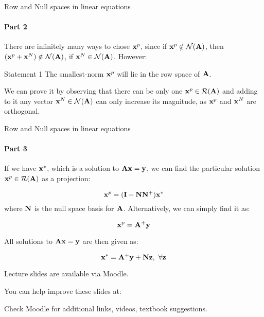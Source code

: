 \documentclass{beamer}
\begin{document}
\begin{frame}{Row and Null spaces in linear equations}
\framesubtitle{Part 2}
\begin{flushleft}

There are infinitely many ways to chose $\mathbf{x}^p$, since if $\mathbf{x}^p \notin \mathcal{N}(\mathbf{A})$, then $(\mathbf{x}^p + \mathbf{x}^N) \notin \mathcal{N}(\mathbf{A})$, if $\mathbf{x}^N \in \mathcal{N}(\mathbf{A})$. However: 

\begin{block}{Statement 1}
The smallest-norm $\mathbf{x}^p$ will lie in the row space of $\mathbf{A}$.
\end{block}

\bigskip

We can prove it by observing that there can be only one $\mathbf{x}^p \in \mathcal{R}(\mathbf{A})$ and adding to it any vector $\mathbf{x}^N \in \mathcal{N}(\mathbf{A})$ can only increase its magnitude, as $\mathbf{x}^p$ and $\mathbf{x}^N$ are orthogonal.

\end{flushleft}
\end{frame}



\begin{frame}{Row and Null spaces in linear equations}
\framesubtitle{Part 3}
\begin{flushleft}

If we have $\mathbf{x}^*$, which is a solution to $\mathbf{A} \mathbf{x} = \mathbf{y}$, we can find the particular solution $\mathbf{x}^p \in \mathcal{R}(\mathbf{A})$ as a projection:

\begin{equation}
    \mathbf{x}^p = (\mathbf{I} - \mathbf{N} \mathbf{N}^+) \mathbf{x}^*
\end{equation}
%
where $\mathbf{N}$ is the null space basis for $\mathbf{A}$. Alternatively, we can simply find it as:

\begin{equation}
    \mathbf{x}^p = \mathbf{A}^+ \mathbf{y}
\end{equation}

\bigskip

All solutions to $\mathbf{A} \mathbf{x} = \mathbf{y}$ are then given as:

\begin{equation}
    \mathbf{x}^* = \mathbf{A}^+ \mathbf{y} + \mathbf{N}\mathbf{z}, \ \forall \mathbf{z}
\end{equation}

\end{flushleft}
\end{frame}




\begin{frame}
	\centerline{Lecture slides are available via Moodle.}
	\bigskip
	\centerline{You can help improve these slides at:}
	\centerline{
		\mygit
	}
	\bigskip
	
	\textcolor{black}{}
	\bigskip
	
	
	\centerline{Check Moodle for additional links, videos, textbook suggestions.}
\end{frame}
\end{document}

